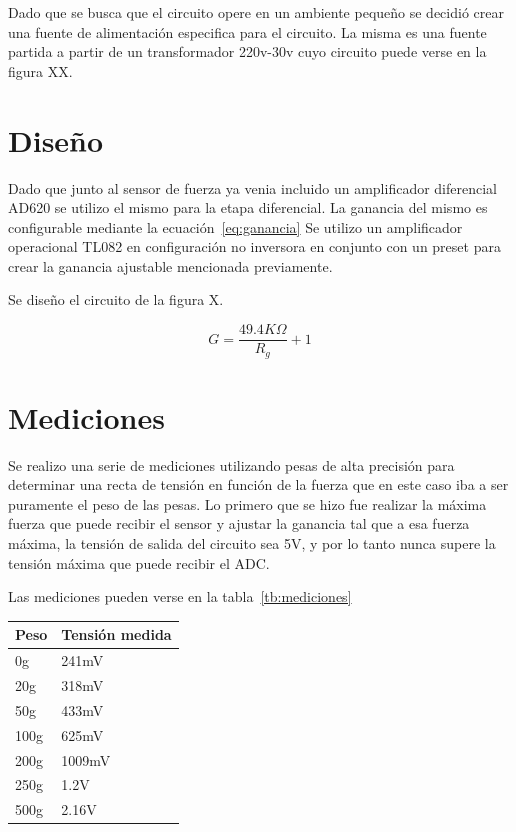 \documentclass[a4paper, 10pt, spanish]{article}
\begin{document}
    Dado que se busca que el circuito opere en un ambiente pequeño se decidió crear una fuente de alimentación especifica para el circuito. La misma es una fuente partida a partir de un transformador 220v-30v cuyo circuito puede verse en la figura XX.

\section{Diseño}


    Dado que junto al sensor de fuerza ya venia incluido un amplificador diferencial AD620 se utilizo el mismo para la etapa diferencial. La ganancia del mismo es configurable mediante la ecuación~\ref{eq:ganancia} Se utilizo un amplificador operacional TL082 en configuración no inversora en conjunto con un preset para crear la ganancia ajustable mencionada previamente.
    
    Se diseño el circuito de la figura X.
    
    \begin{equation}\label{eq:ganancia}
        G = \frac{49.4K\Omega}{R_g} + 1
    \end{equation}

\section{Mediciones}

    Se realizo una serie de mediciones utilizando pesas de alta precisión para determinar una recta de tensión en función de la fuerza que en este caso iba a ser puramente el peso de las pesas. Lo primero que se hizo fue realizar la máxima fuerza que puede recibir el sensor y ajustar la ganancia tal que a esa fuerza máxima, la tensión de salida del circuito sea 5V, y por lo tanto nunca supere la tensión máxima que puede recibir el ADC.
    
    Las mediciones pueden verse en la tabla~\ref{tb:mediciones}
    
    \begin{center}
        \begin{tabular}{| l | l |}
        \hline
        Peso & Tensión medida \\ \hline
        0g   & 241mV  \\ \hline
        20g  & 318mV  \\ \hline
        50g  & 433mV  \\ \hline
        100g & 625mV  \\ \hline
        200g & 1009mV \\ \hline
        250g & 1.2V   \\ \hline
        500g & 2.16V  \\ \hline
        \end{tabular}
    \end{center}
    
\end{document}
